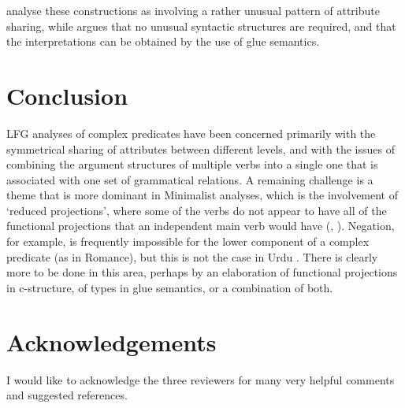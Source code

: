 \documentclass[output=paper,hidelinks]{langscibook}
\begin{document}
\citet{AndrewsManning1999} analyse these constructions as involving a rather unusual pattern of attribute
sharing, while \citet{Andrews2018mapps} argues that no unusual syntactic structures
are required, and that the interpretations can be obtained by the use of glue semantics.

\section{Conclusion}
LFG analyses of complex predicates have been concerned primarily with the symmetrical sharing of
attributes between different levels, and with the issues of combining the argument structures
of multiple verbs into a single one that is associated with one set of grammatical relations.
A remaining challenge is a theme that is more dominant in
Minimalist analyses, which is the involvement of `reduced projections', where some of the
verbs do not appear to have all of the functional projections that an independent main verb
would have (\citealt{Grano2015}, \citealt{Wurmbrand2017}).  Negation, for example, is frequently impossible for the
lower component of a complex predicate (as in Romance), but this is not the case in Urdu
\citep[49]{Butt1995}.  There is clearly more to be done in this area, perhaps
by an elaboration of functional projections in c-structure, of types in glue semantics,
or a combination of both.

\section*{Acknowledgements}
I would like to acknowledge the three reviewers for many very helpful comments and suggested
references.

\sloppy
\printbibliography[heading=subbibliography,notkeyword=this]
\end{document}
